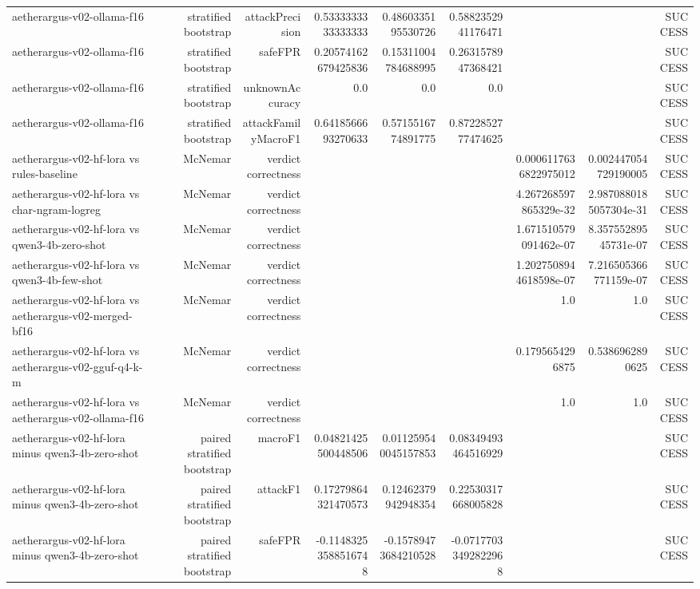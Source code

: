\begin{table}[t]
\begin{tabular}{lrrrrrrrr}
aetherargus-v02-ollama-f16 & stratified bootstrap & attackPrecision & 0.5333333333333333 & 0.4860335195530726 & 0.5882352941176471 &  &  & SUCCESS \\
aetherargus-v02-ollama-f16 & stratified bootstrap & safeFPR & 0.20574162679425836 & 0.15311004784688995 & 0.2631578947368421 &  &  & SUCCESS \\
aetherargus-v02-ollama-f16 & stratified bootstrap & unknownAccuracy & 0.0 & 0.0 & 0.0 &  &  & SUCCESS \\
aetherargus-v02-ollama-f16 & stratified bootstrap & attackFamilyMacroF1 & 0.6418566693270633 & 0.5715516774891775 & 0.8722852777474625 &  &  & SUCCESS \\
aetherargus-v02-hf-lora vs rules-baseline & McNemar & verdict correctness &  &  &  & 0.0006117636822975012 & 0.002447054729190005 & SUCCESS \\
aetherargus-v02-hf-lora vs char-ngram-logreg & McNemar & verdict correctness &  &  &  & 4.267268597865329e-32 & 2.9870880185057304e-31 & SUCCESS \\
aetherargus-v02-hf-lora vs qwen3-4b-zero-shot & McNemar & verdict correctness &  &  &  & 1.671510579091462e-07 & 8.35755289545731e-07 & SUCCESS \\
aetherargus-v02-hf-lora vs qwen3-4b-few-shot & McNemar & verdict correctness &  &  &  & 1.2027508944618598e-07 & 7.216505366771159e-07 & SUCCESS \\
aetherargus-v02-hf-lora vs aetherargus-v02-merged-bf16 & McNemar & verdict correctness &  &  &  & 1.0 & 1.0 & SUCCESS \\
aetherargus-v02-hf-lora vs aetherargus-v02-gguf-q4-k-m & McNemar & verdict correctness &  &  &  & 0.1795654296875 & 0.5386962890625 & SUCCESS \\
aetherargus-v02-hf-lora vs aetherargus-v02-ollama-f16 & McNemar & verdict correctness &  &  &  & 1.0 & 1.0 & SUCCESS \\
aetherargus-v02-hf-lora minus qwen3-4b-zero-shot & paired stratified bootstrap & macroF1 & 0.04821425500448506 & 0.011259540045157853 & 0.08349493464516929 &  &  & SUCCESS \\
aetherargus-v02-hf-lora minus qwen3-4b-zero-shot & paired stratified bootstrap & attackF1 & 0.17279864321470573 & 0.12462379942948354 & 0.22530317668005828 &  &  & SUCCESS \\
aetherargus-v02-hf-lora minus qwen3-4b-zero-shot & paired stratified bootstrap & safeFPR & -0.11483253588516748 & -0.15789473684210528 & -0.07177033492822968 &  &  & SUCCESS \\

\end{tabular}
\end{table}
